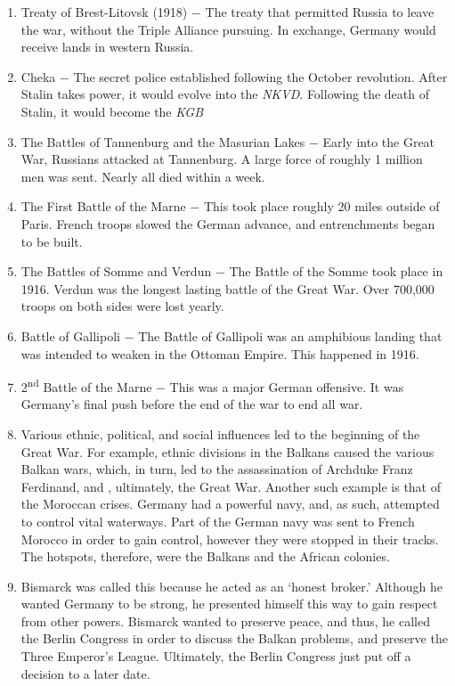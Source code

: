\documentclass[12pt]{article}
\begin{document}
\begin{enumerate}
\item Treaty of Brest-Litovsk (1918) $-$ The treaty that permitted Russia to leave the war, without the Triple Alliance pursuing. In exchange, Germany would receive lands in western Russia.

\item Cheka $-$ The secret police established following the October revolution. After Stalin takes power, it would evolve into the \emph{NKVD}. Following the death of Stalin, it would become the \emph{KGB}

\item The Battles of Tannenburg and the Masurian Lakes $-$ Early into the Great War, Russians attacked at Tannenburg. A large force of roughly 1 million men was sent. Nearly all died within a week.

\item The First Battle of the Marne $-$ This took place roughly 20 miles outside of Paris. French troops slowed the German advance, and entrenchments began to be built.

\item The Battles of Somme and Verdun $-$ The Battle of the Somme took place in 1916. Verdun was the longest lasting battle of the Great War. Over 700,000 troops on both sides were lost yearly.

\item Battle of Gallipoli $-$ The Battle of Gallipoli was an amphibious landing that was intended to weaken in the Ottoman Empire. This happened in 1916.

\item 2\textsuperscript{nd} Battle of the Marne $-$ This was a major German offensive. It was Germany's final push before the end of the war to end all war.

\item Various ethnic, political, and social influences led to the beginning of the Great War. For example, ethnic divisions in the Balkans caused the various Balkan wars, which, in turn, led to the assassination of Archduke Franz Ferdinand, and , ultimately, the Great War. Another such example is that of the Moroccan crises. Germany had a powerful navy, and, as such, attempted to control vital waterways. Part of the German navy was sent to French Morocco in order to gain control, however they were stopped in their tracks. The hotspots, therefore, were the Balkans and the African colonies.

\item Bismarck was called this because he acted as an `honest broker.' Although he wanted Germany to be strong, he presented himself this way to gain respect from other powers. Bismarck wanted to preserve peace, and thus, he called the Berlin Congress in order to discuss the Balkan problems, and preserve the Three Emperor's League. Ultimately, the Berlin Congress just put off a decision to a later date.


\end{enumerate}
\end{document}
